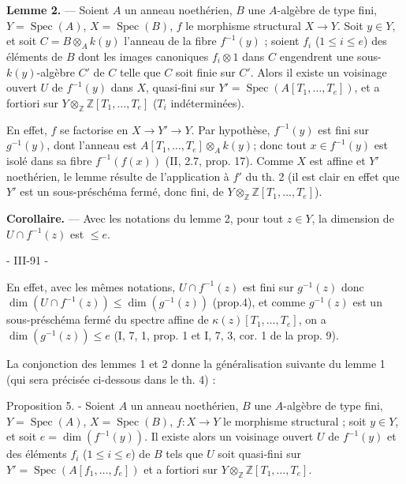 \textbf{Lemme 2.} --- Soient $A$ un anneau noethérien, $B$ une $A$-algèbre de type fini, $Y = \operatorname{Spec}(A)$, $X = \operatorname{Spec}(B)$, $f$ le morphisme structural $X \to Y$. Soit $y \in Y$, et soit $C = B \otimes_A k(y)$ l'anneau de la fibre $f^{-1}(y)$ ; soient $f_i$ ($1 \le i \le e$) des éléments de $B$ dont les images canoniques $f_i \otimes 1$ dans $C$ engendrent une sous-$k(y)$-algèbre $C'$ de $C$ telle que $C$ soit finie sur $C'$. Alors il existe un voisinage ouvert $U$ de $f^{-1}(y)$ dans $X$, quasi-fini sur $Y' = \operatorname{Spec}(A[T_1, \dots, T_e])$, et a fortiori sur $Y \otimes_{\mathbb{Z}} \mathbb{Z}[T_1, \dots, T_e]$ ($T_i$ indéterminées).

En effet, $f$ se factorise en $X \to Y' \to Y$. Par hypothèse, $f^{-1}(y)$ est fini sur $g^{-1}(y)$, dont l'anneau est $A[T_1, \dots, T_e] \otimes_A k(y)$; donc tout $x \in f^{-1}(y)$ est isolé dans sa fibre $f^{-1}(f(x))$ (II, 2.7, prop. 17). Comme $X$ est affine et $Y'$ noethérien, le lemme résulte de l'application à $f'$ du th. 2 (il est clair en effet que $Y'$ est un sous-préschéma fermé, donc fini, de $Y \otimes_{\mathbb{Z}} \mathbb{Z}[T_1, \dots, T_e]$).

\textbf{Corollaire.} --- Avec les notations du lemme 2, pour tout $z \in Y$, la dimension de $U \cap f^{-1}(z)$ est $\le e$.

\newpage


- III-91 -

En effet, avec les mêmes notations, $U \cap f^{-1}(z)$ est fini sur $g^{-1}(z)$ donc $\dim(U \cap f^{-1}(z)) \le \dim(g^{-1}(z))$ (prop.4), et comme $g^{-1}(z)$ est un sous-préschéma fermé du spectre affine de $\kappa(z)[T_1, \dots, T_e]$, on a $\dim(g^{-1}(z)) \le e$ (I, 7, 1, prop. 1 et I, 7, 3, cor. 1 de la prop. 9).

La conjonction des lemmes 1 et 2 donne la généralisation suivante du lemme 1 (qui sera précisée ci-dessous dans le th. 4) :

Proposition 5. - Soient $A$ un anneau noethérien, $B$ une $A$-algèbre de type fini, $Y = \operatorname{Spec}(A)$, $X = \operatorname{Spec}(B)$, $f : X \to Y$ le morphisme structural ; soit $y \in Y$, et soit $e = \dim(f^{-1}(y))$. Il existe alors un voisinage ouvert $U$ de $f^{-1}(y)$ et des éléments $f_i$ ($1 \le i \le e$) de $B$ tels que $U$ soit quasi-fini sur $Y' = \operatorname{Spec}(A[f_1, \dots, f_e])$ et a fortiori sur $Y \otimes_{\mathbb{Z}} \mathbb{Z}[T_1, \dots, T_e]$.

